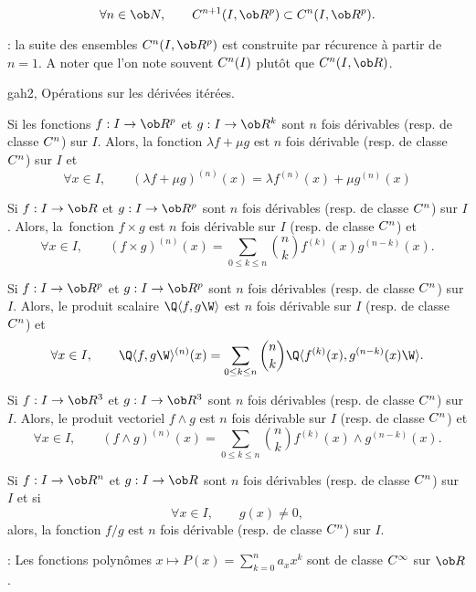 \Propriete
$$
\forall n\in\ob N, \qquad \sc C^{n+1}(I,\ob R^p)\subset\sc C^n(I,\ob R^p).
$$ 

\Remarque : la suite des ensembles $\sc C^n(I,\ob R^p)$ est construite par récurence à partir de $n=1$. A noter que l'on note souvent $\sc C^n(I)$ plutôt que $\sc C^n(I,\ob R)$. 
\bigskip


\Subsection gah2, Opérations sur les dérivées itérées. 

Si les fonctions $f:I\to\ob R^p$ et $g:I\to\ob R^k$ sont $n$ fois dérivables (resp. de classe $\sc C^n$) sur $I$. 
Alors, la fonction $\lambda f+\mu g$ est $n$ fois dérivable (resp. de classe $\sc C^n$) sur $I$ et 
$$
\forall x\in I, \qquad (\lambda f+\mu g)^{(n)}(x)=\lambda f^{(n)}(x)+\mu g^{(n)}(x)
$$

\Theoreme [Title=Formule de Leibniz;$I$ intervalle, $n\in\ob N$]
Si $f:I\to\ob R$ et $g:I\to\ob R^p$ sont $n$ fois dérivables (resp. de classe $\sc C^n$) sur $I$. 
Alors, la~fonction $f\times g$ est $n$ fois dérivable sur $I$ (resp. de classe $\sc C^n$) et 
$$
\forall x\in I, \qquad (f\times g)^{(n)}(x)=\sum_{0\le k\le n}{n\choose k}f^{(k)}(x)g^{(n-k)}(x).
$$


Si $f:I\to\ob R^p$ et $g:I\to\ob R^p$ sont $n$ fois dérivables (resp. de classe $\sc C^n$) sur $I$. 
Alors, le produit scalaire $\Q\langle f,g\W\rangle$ est $n$ fois dérivable sur $I$ (resp. de classe $\sc C^n$) et 
$$
\forall x\in I, \qquad \Q\langle f,g\W\rangle^{(n)}(x)=\sum_{0\le k\le n}{n\choose k}\Q\langle f^{(k)}(x),g^{(n-k)}(x)\W\rangle.
$$

\Theoreme [$I$ intervalle, $n\in\ob N$]
Si $f:I\to\ob R^3$ et $g:I\to\ob R^3$ sont $n$ fois dérivables (resp. de classe $\sc C^n$) sur $I$. 
Alors, le produit vectoriel $f\wedge g$ est $n$ fois dérivable sur $I$ (resp. de classe $\sc C^n$) et 
$$
\forall x\in I, \qquad (f\wedge g)^{(n)}(x)=\sum_{0\le k\le n}{n\choose k}f^{(k)}(x)\wedge g^{(n-k)}(x).
$$


Si $f:I\to\ob R^n$ et $g:I\to\ob R$ sont $n$ fois dérivables (resp. de classe $\sc C^n$) sur $I$ et si 
$$
\forall x\in I, \qquad g(x)\neq 0,
$$ 
alors, la fonction $f/g$ est $n$ fois dérivable (resp. de classe $\sc C^n$) sur $I$. 

\Remarque : Les fonctions polynômes $x\mapsto P(x)=\sum_{k=0}^n a_xx^k$ sont de classe $\sc C^\infty$ 
sur $\ob R$. 
\bigskip

